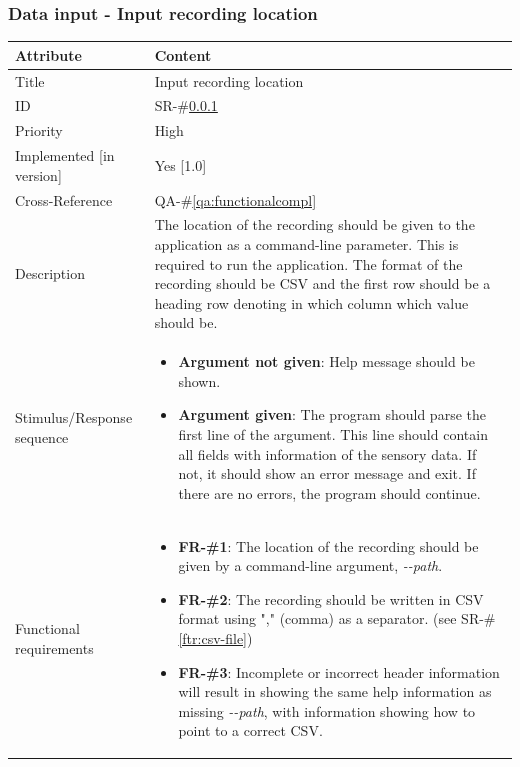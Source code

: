 \documentclass[a4paper]{article}
\begin{document}
\subsubsection{Data input - Input recording location}
\label{ftr:input-recording-location}
\renewcommand*{\arraystretch}{1.4}
\begin{longtable}[l]{ | >{\columncolor{vu-grey-50}}m{110pt} | m{300pt} | }

    \hline
    \rowcolor{vu-blue}
    \textcolor{vu-white}{\textbf{Attribute}} & \textcolor{vu-white}{\textbf{Content}}
    \\ \hline
    
    Title &
    Input recording location
    \\ \hline
    
    ID &
    SR-\#\ref{ftr:input-recording-location}
    \\ \hline
    
    Priority &
    High
    \\ \hline
    
    Implemented [in version] &
    Yes [1.0]
    \\ \hline
    
    Cross-Reference &
    QA-\#\ref{qa:functionalcompl}
    \\ \hline
    
    Description &
    The location of the recording should be given to the application as a command-line parameter. This is required to run the application. The format of the recording should be CSV and the first row should be a heading row denoting in which column which value should be.
    \\ \hline
    
    Stimulus/Response sequence &
    \begin{itemize}
        \item \textbf{Argument not given}: Help message should be shown.
        \item \textbf{Argument given}: The  program  should  parse  the  first  line  of  the  argument. This  line  should contain all fields with information of the sensory data. If not, it should show an error message and exit. If there are no errors, the program should continue.
    \end{itemize}
    \\ \hline
    
    Functional requirements &
    \begin{itemize}
        \item \textbf{FR-\#1}: The location of the recording should be given by a command-line argument, \textit{-}\textit{-path}.
        \item \textbf{FR-\#2}: The recording should be written in CSV format using "," (comma) as a separator. (see SR-\#\ref{ftr:csv-file})
        \item \textbf{FR-\#3}: Incomplete or incorrect header information will result in showing the same help information as missing \textit{-}\textit{-path}, with information showing how to point to a correct CSV.
    \end{itemize}
    \\ \hline
\end{longtable}
\end{document}
